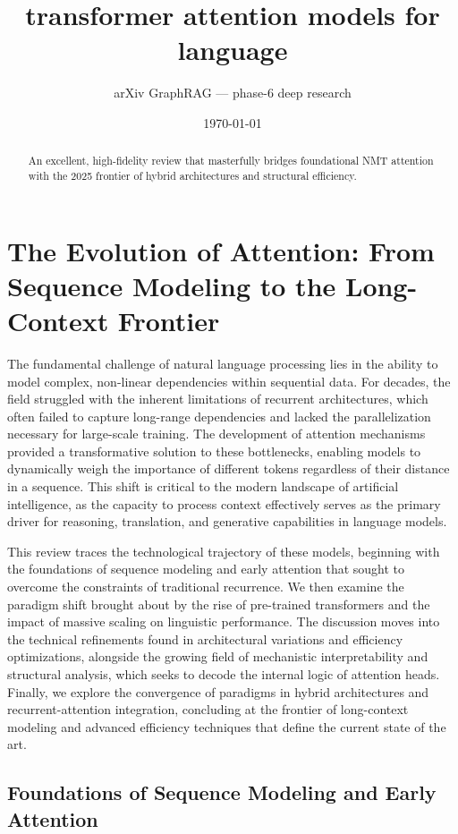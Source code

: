 \documentclass[11pt]{article}
\title{transformer attention models for language}
\author{arXiv GraphRAG --- phase-6 deep research}
\date{\today}
\begin{document}
\maketitle

\begin{abstract}
An excellent, high-fidelity review that masterfully bridges foundational NMT attention with the 2025 frontier of hybrid architectures and structural efficiency.
\end{abstract}

\section{The Evolution of Attention: From Sequence Modeling to the Long-Context Frontier}

The fundamental challenge of natural language processing lies in the ability to model complex, non-linear dependencies within sequential data. For decades, the field struggled with the inherent limitations of recurrent architectures, which often failed to capture long-range dependencies and lacked the parallelization necessary for large-scale training. The development of attention mechanisms provided a transformative solution to these bottlenecks, enabling models to dynamically weigh the importance of different tokens regardless of their distance in a sequence. This shift is critical to the modern landscape of artificial intelligence, as the capacity to process context effectively serves as the primary driver for reasoning, translation, and generative capabilities in language models.

This review traces the technological trajectory of these models, beginning with the foundations of sequence modeling and early attention that sought to overcome the constraints of traditional recurrence. We then examine the paradigm shift brought about by the rise of pre-trained transformers and the impact of massive scaling on linguistic performance. The discussion moves into the technical refinements found in architectural variations and efficiency optimizations, alongside the growing field of mechanistic interpretability and structural analysis, which seeks to decode the internal logic of attention heads. Finally, we explore the convergence of paradigms in hybrid architectures and recurrent-attention integration, concluding at the frontier of long-context modeling and advanced efficiency techniques that define the current state of the art.

\subsection{Foundations of Sequence Modeling and Early Attention}
\end{document}
